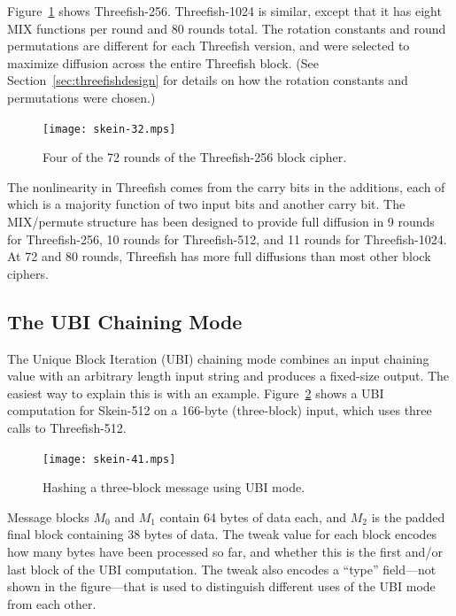\documentclass[11pt,twoside]{article}
\begin{document}
Figure~\ref{fig:Threefish256} shows Threefish-256.  Threefish-1024 is similar, except that it has eight MIX functions per round and 80 rounds total.  The rotation constants and round permutations are different for each Threefish version, and were selected to maximize diffusion across the entire Threefish block.  (See Section~\ref{sec:threefishdesign} for details on how the rotation constants and permutations were chosen.)
%
\begin{figure}[htbp]
\begin{center}
\texttt{[image: skein-32.mps]}
\end{center}
\caption{Four of the 72 rounds of the Threefish-256 block cipher.} \label{fig:Threefish256}
\end{figure}

The nonlinearity in Threefish comes from the carry bits in the additions, each of which is a majority function of two input bits and another carry bit.  The MIX/permute structure has been designed to provide full diffusion in 9 rounds for Threefish-256, 10 rounds for Threefish-512, and 11 rounds for Threefish-1024.  At 72 and 80 rounds, Threefish has more full diffusions than most other block ciphers.

\subsection{The UBI Chaining Mode}

The Unique Block Iteration (UBI) chaining mode combines an input chaining value with an arbitrary length input string and produces a fixed-size output.  The easiest way to explain this is with an example.  Figure~\ref{fig:UBI} shows a UBI computation for Skein-512 on a 166-byte (three-block) input, which uses three calls to Threefish-512.
%
\begin{figure}[htbp]
\begin{center}
\texttt{[image: skein-41.mps]}
\end{center}
\caption{Hashing a three-block message using UBI mode.} \label{fig:UBI}
\end{figure}

Message blocks $M_0$ and $M_1$ contain 64 bytes of data each, and $M_2$ is the padded final block containing 38 bytes of data. The tweak value for each block encodes how many bytes have been processed so far, and whether this is the first and/or last block of the UBI computation.  The tweak also encodes a ``type'' field---not shown in the figure---that is used to distinguish different uses of the UBI mode from each other.
\end{document}
